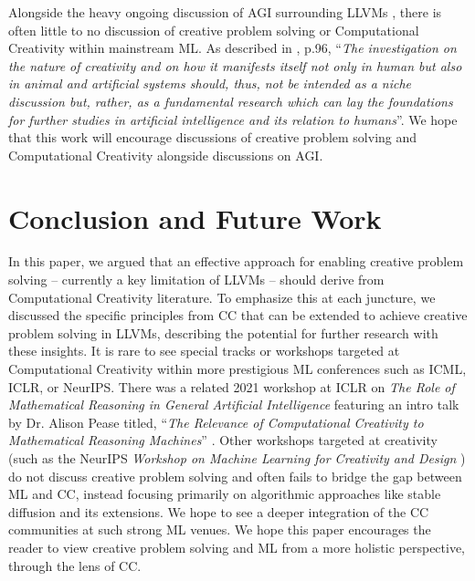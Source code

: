 Alongside the heavy ongoing discussion of AGI surrounding LLVMs \cite{bubeck2023sparks,fei2022towards,ma2023brain,xi2023rise,moor2023foundation,grudin2019chatbots}, there is often little to no discussion of creative problem solving or Computational Creativity within mainstream ML. As described in \cite{moruzzi2020artificial}, p.96, ``\textit{The investigation on the nature of creativity and on how it manifests itself not only in human but also in animal and artificial systems should, thus, not be intended as a niche discussion but, rather, as a fundamental research which can lay the foundations for further studies in artificial intelligence and its relation to humans}''. We hope that this work will encourage discussions of creative problem solving and Computational Creativity alongside discussions on AGI.

\section{Conclusion and Future Work}
In this paper, we argued that an effective approach for enabling creative problem solving -- currently a key limitation of LLVMs -- should derive from Computational Creativity literature. To emphasize this at each juncture, we discussed the specific principles from CC that can be extended to achieve creative problem solving in LLVMs, describing the potential for further research with these insights. It is rare to see special tracks or workshops targeted at Computational Creativity within more prestigious ML conferences such as ICML, ICLR, or NeurIPS. There was a related 2021 workshop at ICLR on \textit{The Role of Mathematical Reasoning in General Artificial Intelligence} featuring an intro talk by Dr. Alison Pease titled, ``\textit{The Relevance of Computational Creativity to Mathematical Reasoning Machines}'' \cite{pease2021relevance}. Other workshops targeted at creativity (such as the NeurIPS \textit{Workshop on Machine Learning for Creativity and Design} \cite{NeurIPS2022creativity}) do not discuss creative problem solving and often fails to bridge the gap between ML and CC, instead focusing primarily on algorithmic approaches like stable diffusion and its extensions. We hope to see a deeper integration of the CC communities at such strong ML venues. We hope this paper encourages the reader to view creative problem solving and ML from a more holistic perspective, through the lens of CC.




